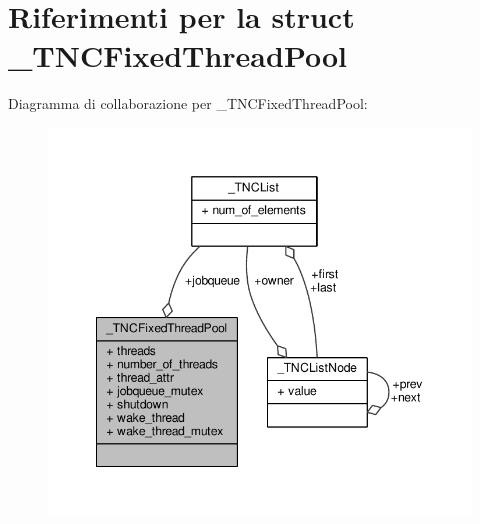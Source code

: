 \hypertarget{struct__TNCFixedThreadPool}{}\section{Riferimenti per la struct \+\_\+\+T\+N\+C\+Fixed\+Thread\+Pool}
\label{struct__TNCFixedThreadPool}


Diagramma di collaborazione per \+\_\+\+T\+N\+C\+Fixed\+Thread\+Pool\+:
\nopagebreak
\begin{figure}[H]
\begin{center}
\leavevmode
\includegraphics[width=349pt]{struct__TNCFixedThreadPool__coll__graph}
\end{center}
\end{figure}

